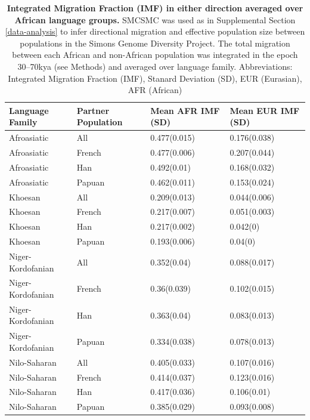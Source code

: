 \begin{table}[ht]
\centering
\begin{tabular}{llll}
  \hline
Language Family & Partner Population & Mean AFR IMF (SD) & Mean EUR IMF (SD) \\ 
  \hline
Afroasiatic & All & 0.477(0.015) & 0.176(0.038) \\ 
  Afroasiatic & French & 0.477(0.006) & 0.207(0.044) \\ 
  Afroasiatic & Han & 0.492(0.01) & 0.168(0.032) \\ 
  Afroasiatic & Papuan & 0.462(0.011) & 0.153(0.024) \\ 
  Khoesan & All & 0.209(0.013) & 0.044(0.006) \\ 
  Khoesan & French & 0.217(0.007) & 0.051(0.003) \\ 
  Khoesan & Han & 0.217(0.002) & 0.042(0) \\ 
  Khoesan & Papuan & 0.193(0.006) & 0.04(0) \\ 
  Niger-Kordofanian & All & 0.352(0.04) & 0.088(0.017) \\ 
  Niger-Kordofanian & French & 0.36(0.039) & 0.102(0.015) \\ 
  Niger-Kordofanian & Han & 0.363(0.04) & 0.083(0.013) \\ 
  Niger-Kordofanian & Papuan & 0.334(0.038) & 0.078(0.013) \\ 
  Nilo-Saharan & All & 0.405(0.033) & 0.107(0.016) \\ 
  Nilo-Saharan & French & 0.414(0.037) & 0.123(0.016) \\ 
  Nilo-Saharan & Han & 0.417(0.036) & 0.106(0.01) \\ 
  Nilo-Saharan & Papuan & 0.385(0.029) & 0.093(0.008) \\ 
   \hline
\end{tabular}
\caption[Tests for difference between integrated migration fractions in the SGDP averaged over African language families]{{\bf Integrated Migration Fraction (IMF) in either direction averaged over African language groups.} SMCSMC was used as in Supplemental Section \ref{data-analysis} to infer directional migration and effective population size between populations in the Simons Genome Diversity Project. The total migration between each African and non-African population was integrated in the epoch 30--70kya (see Methods) and averaged over language family. Abbreviations: Integrated Migration Fraction (IMF), Stanard Deviation (SD), EUR (Eurasian), AFR (African)} 
\label{table:average_sgdp_migration_table}
\end{table}

